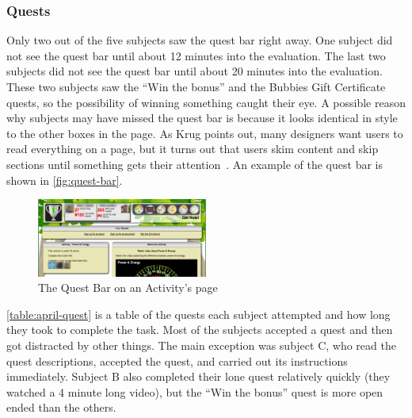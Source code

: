 \subsubsection{Quests}

Only two out of the five subjects saw the quest bar right away. One subject did not see the quest bar until about 12 minutes into the evaluation. The last two subjects did not see the quest bar until about 20 minutes into the evaluation. These two subjects saw the ``Win the  bonus'' and the Bubbies Gift Certificate quests, so the possibility of winning something caught their eye. A possible reason why subjects may have missed the quest bar is because it looks identical in style to the other boxes in the page. As Krug points out, many designers want users to read everything on a page, but it turns out that users skim content and skip sections until something gets their attention~\cite{krug-dmmt}. An example of the quest bar is shown in \autoref{fig:quest-bar}.

\begin{figure}[t]
    \center
    \includegraphics[width=0.5\textwidth]{images/quest-bar.eps}
    \caption{The Quest Bar on an Activity's page}
    \label{fig:quest-bar}
\end{figure}

\autoref{table:april-quest} is a table of the quests each subject attempted and how long they took to complete the task. Most of the subjects accepted a quest and then got distracted by other things. The main exception was subject C, who read the quest descriptions, accepted the quest, and carried out its instructions immediately. Subject B also completed their lone quest relatively quickly (they watched a 4 minute long video), but the ``Win the  bonus'' quest is more open ended than the others.

